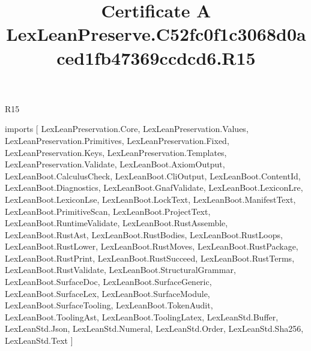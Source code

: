 \begin{lexlean}{R15}
\title{Certificate A LexLeanPreserve.C52fc0f1c3068d0aced1fb47369ccdcd6.R15}
\begin{coremodule}
imports [
  LexLeanPreservation.Core,
  LexLeanPreservation.Values,
  LexLeanPreservation.Primitives,
  LexLeanPreservation.Fixed,
  LexLeanPreservation.Keys,
  LexLeanPreservation.Templates,
  LexLeanPreservation.Validate,
  LexLeanBoot.AxiomOutput,
  LexLeanBoot.CalculusCheck,
  LexLeanBoot.CliOutput,
  LexLeanBoot.ContentId,
  LexLeanBoot.Diagnostics,
  LexLeanBoot.GnafValidate,
  LexLeanBoot.LexiconLre,
  LexLeanBoot.LexiconLse,
  LexLeanBoot.LockText,
  LexLeanBoot.ManifestText,
  LexLeanBoot.PrimitiveScan,
  LexLeanBoot.ProjectText,
  LexLeanBoot.RuntimeValidate,
  LexLeanBoot.RustAssemble,
  LexLeanBoot.RustAst,
  LexLeanBoot.RustBodies,
  LexLeanBoot.RustLoops,
  LexLeanBoot.RustLower,
  LexLeanBoot.RustMoves,
  LexLeanBoot.RustPackage,
  LexLeanBoot.RustPrint,
  LexLeanBoot.RustSucceed,
  LexLeanBoot.RustTerms,
  LexLeanBoot.RustValidate,
  LexLeanBoot.StructuralGrammar,
  LexLeanBoot.SurfaceDoc,
  LexLeanBoot.SurfaceGeneric,
  LexLeanBoot.SurfaceLex,
  LexLeanBoot.SurfaceModule,
  LexLeanBoot.SurfaceTooling,
  LexLeanBoot.TokenAudit,
  LexLeanBoot.ToolingAst,
  LexLeanBoot.ToolingLatex,
  LexLeanStd.Buffer,
  LexLeanStd.Json,
  LexLeanStd.Numeral,
  LexLeanStd.Order,
  LexLeanStd.Sha256,
  LexLeanStd.Text
]


\end{coremodule}
\end{lexlean}

